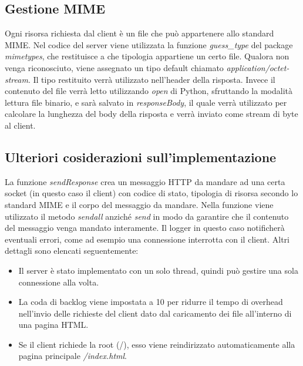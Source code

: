 \documentclass[a4paper,12pt]{report}
\begin{document}
\subsection{Gestione MIME}
Ogni risorsa richiesta dal client è un file che può appartenere allo standard MIME. Nel codice del server viene utilizzata la funzione \textit{guess\_type} del package \textit{mimetypes}, che restituisce a che tipologia appartiene un certo file. Qualora non venga riconosciuto, viene assegnato un tipo default chiamato \textit{application/octet-stream}. Il tipo restituito verrà utilizzato nell'header della risposta. Invece il contenuto del file verrà letto utilizzando \textit{open} di Python, sfruttando la modalità lettura file binario, e sarà salvato in \textit{responseBody}, il quale verrà utilizzato per calcolare la lunghezza del body della risposta e verrà inviato come stream di byte al client. 

\subsection{Ulteriori cosiderazioni sull'implementazione}

La funzione \textit{sendResponse} crea un messaggio HTTP da mandare ad una certa socket (in questo caso il client) con codice di stato, tipologia di risorsa secondo lo standard MIME e il corpo del messaggio da mandare. Nella funzione viene utilizzato il metodo \textit{sendall} anziché \textit{send} in modo da garantire che il contenuto del messaggio venga mandato interamente. Il logger in questo caso notificherà eventuali errori, come ad esempio una connessione interrotta con il client. Altri dettagli sono elencati seguentemente:
%
\begin{itemize}
    \item Il server è stato implementato con un solo thread, quindi può gestire una sola connessione alla volta.
    \item La coda di backlog viene impostata a 10 per ridurre il tempo di overhead nell'invio delle richieste del client dato dal caricamento dei file all'interno di una pagina HTML.
    \item Se il client richiede la root (/), esso viene reindirizzato automaticamente alla pagina principale \textit{/index.html}.
\end{itemize}
\end{document}
